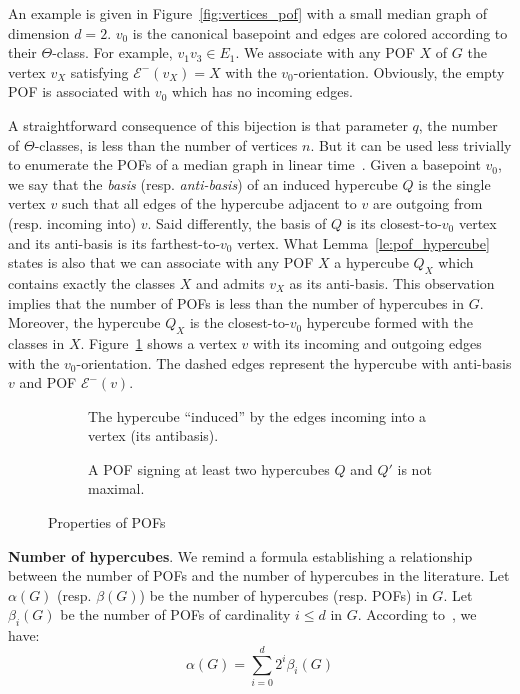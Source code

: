 \documentclass{article}
\begin{document}
An example is given in Figure~\ref{fig:vertices_pof} with a small median graph of dimension $d=2$. $v_0$ is the canonical basepoint  and edges are colored according to  their $\Theta$-class. For example, $v_1v_3 \in E_1$. We associate with any POF $X$ of $G$ the vertex $v_X$ satisfying $\mathcal{E}^-(v_X) = X$ with the $v_0$-orientation. Obviously, the empty POF is associated with $v_0$ which has no incoming edges.

A straightforward consequence of this bijection is that parameter $q$, the number of $\Theta$-classes, is less than the number of vertices $n$. But it can be used less trivially to enumerate the POFs of a median graph in linear time~\cite{BaQuSaMa02,Ko09}. Given a basepoint $v_0$, we say that the \textit{basis} (resp. \textit{anti-basis}) of an induced hypercube $Q$ is the single vertex $v$ such that all edges of the hypercube adjacent to $v$ are outgoing from (resp. incoming into) $v$. Said differently, the basis of $Q$ is its closest-to-$v_0$ vertex and its anti-basis is its farthest-to-$v_0$ vertex. What Lemma~\ref{le:pof_hypercube} states is also that we can associate with any POF $X$ a hypercube $Q_X$ which contains exactly the classes $X$ and admits $v_X$ as its anti-basis. This observation implies that the number of POFs is less than the number of hypercubes in $G$. Moreover, the hypercube $Q_X$ is the closest-to-$v_0$ hypercube formed with the classes in $X$. Figure~\ref{subfig:ingoing_edges} shows a vertex $v$ with its incoming and outgoing edges with the $v_0$-orientation. The dashed edges represent the hypercube with anti-basis $v$ and POF $\mathcal{E}^-(v)$.

\begin{figure}[h]
\begin{subfigure}[b]{0.49\columnwidth}
\centering
\scalebox{0.8}{}
\caption{The hypercube ``induced'' by the edges incoming into a vertex (its antibasis).}
\label{subfig:ingoing_edges}
\end{subfigure}
\begin{subfigure}[b]{0.49\columnwidth}
\centering
\scalebox{0.8}{}
\caption{A POF signing at least two hypercubes $Q$ and $Q'$ is not maximal.}
\label{subfig:maximal_pof}
\end{subfigure}
\caption{Properties of POFs}
\label{fig:properties_pofs}
\end{figure} 

\textbf{Number of hypercubes}. We remind a formula establishing a relationship between the number of POFs and the number of hypercubes in the literature. Let $\alpha(G)$ (resp. $\beta(G)$) be the number of hypercubes (resp. POFs) in $G$. Let $\beta_i(G)$ be the number of POFs of cardinality $i \le d$ in $G$. According to~\cite{BaQuSaMa02,Ko09}, we have:
\begin{equation}
\alpha(G) = \sum_{i=0}^d 2^i\beta_i(G)
\label{eq:number_hypercubes}
\end{equation}
\end{document}
